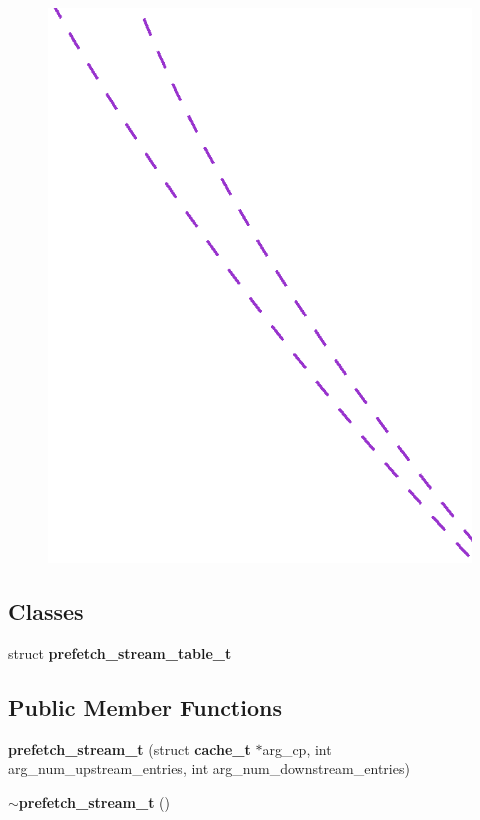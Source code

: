 \begin{figure}[H]
\begin{center}
\leavevmode
\includegraphics[width=400pt]{classprefetch__stream__t__coll__graph}
\end{center}
\end{figure}
\subsection*{Classes}
\begin{CompactItemize}
\item 
struct {\bf prefetch\_\-stream\_\-table\_\-t}
\end{CompactItemize}
\subsection*{Public Member Functions}
\begin{CompactItemize}
\item 
{\bf prefetch\_\-stream\_\-t} (struct {\bf cache\_\-t} $\ast$arg\_\-cp, int arg\_\-num\_\-upstream\_\-entries, int arg\_\-num\_\-downstream\_\-entries)
\item 
{\bf $\sim$prefetch\_\-stream\_\-t} ()
\end{CompactItemize}
